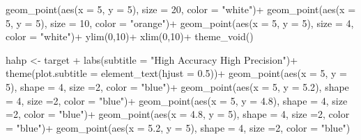 \documentclass[
  letterpaper,
  DIV=11,
  numbers=noendperiod]{scrreprt}
\newenvironment{Shaded}{\begin{snugshade}}{\end{snugshade}}
\newcommand{\AttributeTok}[1]{\textcolor[rgb]{0.40,0.45,0.13}{#1}}
\newcommand{\DecValTok}[1]{\textcolor[rgb]{0.68,0.00,0.00}{#1}}
\newcommand{\FloatTok}[1]{\textcolor[rgb]{0.68,0.00,0.00}{#1}}
\newcommand{\FunctionTok}[1]{\textcolor[rgb]{0.28,0.35,0.67}{#1}}
\newcommand{\NormalTok}[1]{\textcolor[rgb]{0.00,0.23,0.31}{#1}}
\newcommand{\OtherTok}[1]{\textcolor[rgb]{0.00,0.23,0.31}{#1}}
\newcommand{\SpecialCharTok}[1]{\textcolor[rgb]{0.37,0.37,0.37}{#1}}
\newcommand{\StringTok}[1]{\textcolor[rgb]{0.13,0.47,0.30}{#1}}
\begin{document}
\begin{Shaded}
\begin{Highlighting}[]
  \FunctionTok{geom\_point}\NormalTok{(}\FunctionTok{aes}\NormalTok{(}\AttributeTok{x =} \DecValTok{5}\NormalTok{, }\AttributeTok{y =} \DecValTok{5}\NormalTok{), }\AttributeTok{size =} \DecValTok{20}\NormalTok{, }\AttributeTok{color =} \StringTok{"white"}\NormalTok{)}\SpecialCharTok{+}
  \FunctionTok{geom\_point}\NormalTok{(}\FunctionTok{aes}\NormalTok{(}\AttributeTok{x =} \DecValTok{5}\NormalTok{, }\AttributeTok{y =} \DecValTok{5}\NormalTok{), }\AttributeTok{size =} \DecValTok{10}\NormalTok{, }\AttributeTok{color =} \StringTok{"orange"}\NormalTok{)}\SpecialCharTok{+}
  \FunctionTok{geom\_point}\NormalTok{(}\FunctionTok{aes}\NormalTok{(}\AttributeTok{x =} \DecValTok{5}\NormalTok{, }\AttributeTok{y =} \DecValTok{5}\NormalTok{), }\AttributeTok{size =} \DecValTok{4}\NormalTok{, }\AttributeTok{color =} \StringTok{"white"}\NormalTok{)}\SpecialCharTok{+}
  \FunctionTok{ylim}\NormalTok{(}\DecValTok{0}\NormalTok{,}\DecValTok{10}\NormalTok{)}\SpecialCharTok{+}
  \FunctionTok{xlim}\NormalTok{(}\DecValTok{0}\NormalTok{,}\DecValTok{10}\NormalTok{)}\SpecialCharTok{+}
  \FunctionTok{theme\_void}\NormalTok{()}

\NormalTok{hahp }\OtherTok{\textless{}{-}}\NormalTok{ target }\SpecialCharTok{+}
  \FunctionTok{labs}\NormalTok{(}\AttributeTok{subtitle =} \StringTok{"High Accuracy High Precision"}\NormalTok{)}\SpecialCharTok{+}
  \FunctionTok{theme}\NormalTok{(}\AttributeTok{plot.subtitle =} \FunctionTok{element\_text}\NormalTok{(}\AttributeTok{hjust =} \FloatTok{0.5}\NormalTok{))}\SpecialCharTok{+}
  \FunctionTok{geom\_point}\NormalTok{(}\FunctionTok{aes}\NormalTok{(}\AttributeTok{x =} \DecValTok{5}\NormalTok{, }\AttributeTok{y =} \DecValTok{5}\NormalTok{), }\AttributeTok{shape =} \DecValTok{4}\NormalTok{, }\AttributeTok{size =}\DecValTok{2}\NormalTok{, }\AttributeTok{color =} \StringTok{"blue"}\NormalTok{)}\SpecialCharTok{+}
  \FunctionTok{geom\_point}\NormalTok{(}\FunctionTok{aes}\NormalTok{(}\AttributeTok{x =} \DecValTok{5}\NormalTok{, }\AttributeTok{y =} \FloatTok{5.2}\NormalTok{), }\AttributeTok{shape =} \DecValTok{4}\NormalTok{, }\AttributeTok{size =}\DecValTok{2}\NormalTok{, }\AttributeTok{color =} \StringTok{"blue"}\NormalTok{)}\SpecialCharTok{+}
  \FunctionTok{geom\_point}\NormalTok{(}\FunctionTok{aes}\NormalTok{(}\AttributeTok{x =} \DecValTok{5}\NormalTok{, }\AttributeTok{y =} \FloatTok{4.8}\NormalTok{), }\AttributeTok{shape =} \DecValTok{4}\NormalTok{, }\AttributeTok{size =}\DecValTok{2}\NormalTok{, }\AttributeTok{color =} \StringTok{"blue"}\NormalTok{)}\SpecialCharTok{+}
  \FunctionTok{geom\_point}\NormalTok{(}\FunctionTok{aes}\NormalTok{(}\AttributeTok{x =} \FloatTok{4.8}\NormalTok{, }\AttributeTok{y =} \DecValTok{5}\NormalTok{), }\AttributeTok{shape =} \DecValTok{4}\NormalTok{, }\AttributeTok{size =}\DecValTok{2}\NormalTok{, }\AttributeTok{color =} \StringTok{"blue"}\NormalTok{)}\SpecialCharTok{+}
  \FunctionTok{geom\_point}\NormalTok{(}\FunctionTok{aes}\NormalTok{(}\AttributeTok{x =} \FloatTok{5.2}\NormalTok{, }\AttributeTok{y =} \DecValTok{5}\NormalTok{), }\AttributeTok{shape =} \DecValTok{4}\NormalTok{, }\AttributeTok{size =}\DecValTok{2}\NormalTok{, }\AttributeTok{color =} \StringTok{"blue"}\NormalTok{)}



\end{Highlighting}
\end{Shaded}
\end{document}
